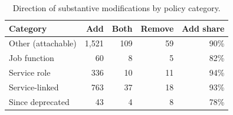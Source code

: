 \begin{table}[t]
\centering
\caption{Direction of substantive modifications by policy category.}
\label{tab:kind}
\footnotesize
\begin{tabular}{lrrrr}
\toprule
Category & Add & Both & Remove & Add share \\
\midrule
Other (attachable) & 1,521 & 109 & 59 & 90\% \\
Job function & 60 & 8 & 5 & 82\% \\
Service role & 336 & 10 & 11 & 94\% \\
Service-linked & 763 & 37 & 18 & 93\% \\
Since deprecated & 43 & 4 & 8 & 78\% \\
\bottomrule
\end{tabular}
\end{table}
